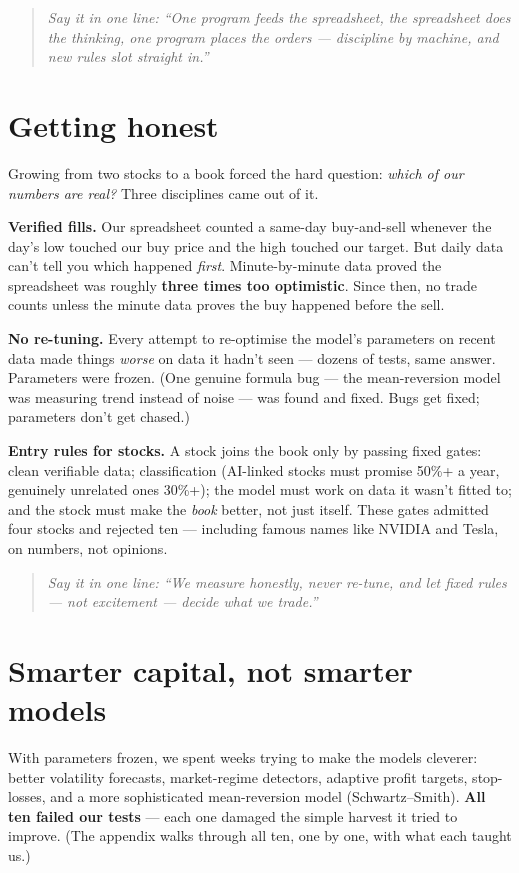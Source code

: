 \documentclass[11pt,a4paper]{article}
\newcommand{\oneline}[1]{\begin{quote}\itshape\color{bcteal}Say it in one line:
``#1''\end{quote}}
\begin{document}
\oneline{One program feeds the spreadsheet, the spreadsheet does the
thinking, one program places the orders --- discipline by machine, and new
rules slot straight in.}

\section{Getting honest}

Growing from two stocks to a book forced the hard question: \emph{which of
our numbers are real?} Three disciplines came out of it.

\textbf{Verified fills.} Our spreadsheet counted a same-day buy-and-sell
whenever the day's low touched our buy price and the high touched our target.
But daily data can't tell you which happened \emph{first}. Minute-by-minute
data proved the spreadsheet was roughly \textbf{three times too optimistic}.
Since then, no trade counts unless the minute data proves the buy happened
before the sell.

\textbf{No re-tuning.} Every attempt to re-optimise the model's parameters on
recent data made things \emph{worse} on data it hadn't seen --- dozens of
tests, same answer. Parameters were frozen. (One genuine formula bug --- the
mean-reversion model was measuring trend instead of noise --- was found and
fixed. Bugs get fixed; parameters don't get chased.)

\textbf{Entry rules for stocks.} A stock joins the book only by passing fixed
gates: clean verifiable data; classification (AI-linked stocks must promise
50\%+ a year, genuinely unrelated ones 30\%+); the model must work on data it
wasn't fitted to; and the stock must make the \emph{book} better, not just
itself. These gates admitted four stocks and rejected ten --- including famous
names like NVIDIA and Tesla, on numbers, not opinions.

\oneline{We measure honestly, never re-tune, and let fixed rules --- not
excitement --- decide what we trade.}

\section{Smarter capital, not smarter models}

With parameters frozen, we spent weeks trying to make the models cleverer:
better volatility forecasts, market-regime detectors, adaptive profit
targets, stop-losses, and a more sophisticated mean-reversion model
(Schwartz--Smith). \textbf{All ten failed our tests} --- each one damaged the
simple harvest it tried to improve. (The appendix walks through all ten,
one by one, with what each taught us.)
\end{document}
